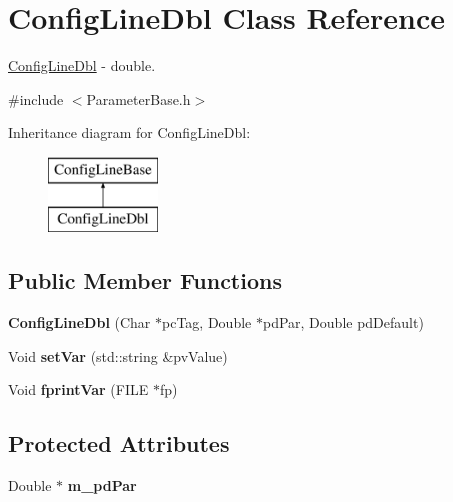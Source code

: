 \hypertarget{class_config_line_dbl}{}\section{Config\+Line\+Dbl Class Reference}
\label{class_config_line_dbl}


\hyperlink{class_config_line_dbl}{Config\+Line\+Dbl} -\/ double.  




{\ttfamily \#include $<$Parameter\+Base.\+h$>$}

Inheritance diagram for Config\+Line\+Dbl\+:\begin{figure}[H]
\begin{center}
\leavevmode
\includegraphics[height=2.000000cm]{class_config_line_dbl}
\end{center}
\end{figure}
\subsection*{Public Member Functions}
\begin{DoxyCompactItemize}
\item 
\mbox{\label{class_config_line_dbl_aa88d87299ac96f7f98c1b7754d18994a}} 
{\bfseries Config\+Line\+Dbl} (Char $\ast$pc\+Tag, Double $\ast$pd\+Par, Double pd\+Default)
\item 
\mbox{\label{class_config_line_dbl_aa3cdc20a68abb2f0e1707972f82e5afe}} 
Void {\bfseries set\+Var} (std\+::string \&pv\+Value)
\item 
\mbox{\label{class_config_line_dbl_a98591d6e2502a0fd36f3a9c2e1c125bb}} 
Void {\bfseries fprint\+Var} (F\+I\+LE $\ast$fp)
\end{DoxyCompactItemize}
\subsection*{Protected Attributes}
\begin{DoxyCompactItemize}
\item 
\mbox{\label{class_config_line_dbl_ae39355d49a53710202359be25e1f84cc}} 
Double $\ast$ {\bfseries m\+\_\+pd\+Par}
\end{DoxyCompactItemize}

